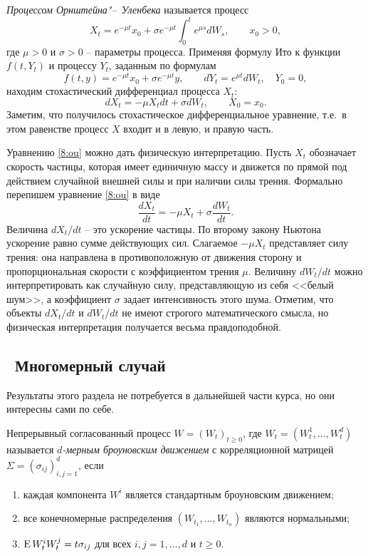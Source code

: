 \begin{example}
\emph{Процессом Орнштейна"--~Уленбека} называется процесс
\[
X_t = e^{-\mu t}x_0 + \sigma e^{-\mu t}\int_0^t e^{\mu s} dW_s, \qquad x_0>0,
\]
где $\mu>0$ и $\sigma>0$ -- параметры процесса.
Применяя формулу Ито к функции $f(t,Y_t)$ и процессу $Y_t$, заданным по формулам
\[
f(t,y) = e^{-\mu t}x_0 + \sigma e^{-\mu t} y, \qquad
dY_t = e^{\mu t} dW_t, \quad Y_0=0,
\]
находим стохастический дифференциал процесса $X_t$:
\begin{equation}
\label{8:ou}
dX_t = -\mu X_t dt + \sigma dW_t, \qquad X_0=x_0.
\end{equation}
Заметим, что получилось стохастическое дифференциальное уравнение, т.е.\ в этом равенстве процесс $X$ входит и в левую, и правую часть.

Уравнению \eqref{8:ou} можно дать физическую интерпретацию.
Пусть $X_t$ обозначает скорость частицы, которая имеет единичную массу и движется по прямой под действием случайной внешней силы и при наличии силы трения.
Формально перепишем уравнение \eqref{8:ou} в виде
\[
\frac{dX_t}{dt} = -\mu X_t + \sigma \frac{dW_t}{dt}.
\]
Величина $d X_t/dt$ -- это ускорение частицы.
По второму закону Ньютона ускорение равно сумме действующих сил.
Слагаемое $-\mu X_t$ представляет силу трения: она направлена в противоположную от движения сторону и пропорциональная скорости с коэффициентом трения $\mu$.
Величину $dW_t/dt$ можно интерпретировать как случайную силу, представляющую из себя <<белый шум>>, а коэффициент $\sigma$ задает интенсивность этого шума.
Отметим, что объекты $dX_t/dt$ и $dW_t/dt$ не имеют строгого математического смысла, но физическая интерпретация получается весьма правдоподобной.
\end{example}


\subsection{\difficult\ Многомерный случай}

Результаты этого раздела не потребуется в дальнейшей части курса, но они интересны сами по себе.

\begin{definition}
Непрерывный согласованный процесс $W=(W_t)_{t\ge 0}$, где $W_t=(W_t^1,\dots,W_t^d)$ называется \emph{$d$-мерным броуновским движением} с корреляционной матрицей $\Sigma = (\sigma_{ij})_{i,j=1}^d$, если
\begin{enumerate}
\item каждая компонента $W^i$ является стандартным броуновским движением;
\item все конечномерные распределения $(W_{t_1},\dots, W_{t_n})$ являются нормальными;
\item $\operatorname{E} W_t^iW_t^j = t\sigma_{ij}$ для всех $i,j=1,\dots,d$ и $t\ge0$.
\end{enumerate}
\end{definition}

